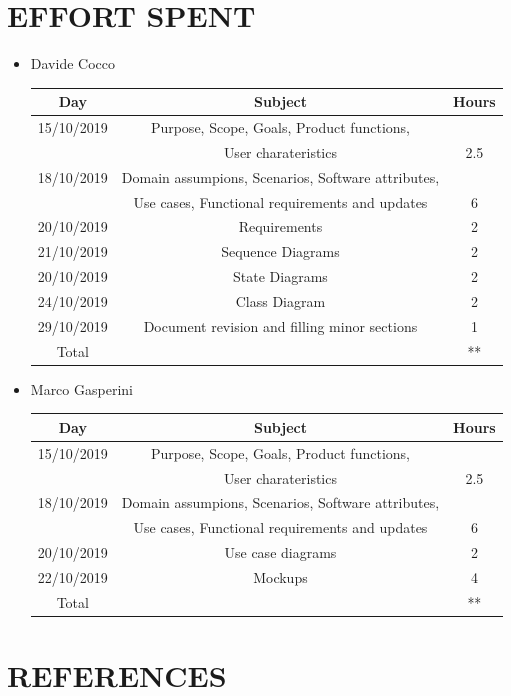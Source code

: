 \documentclass[12pt,a4paper]{article}
\begin{document}
\section{EFFORT	SPENT}
\begin{itemize}
\item {Davide Cocco}
 \begin{center}
			\begin{tabular}{| c | c | c |}
				\hline
				Day & Subject & Hours \\ \hline
				15/10/2019 & Purpose, Scope, Goals, Product functions,\\
				&User charateristics & 2.5 \\
				18/10/2019 & Domain assumpions, Scenarios, Software attributes, \\
				& Use cases, Functional requirements and updates  & 6\\
				20/10/2019 & Requirements  & 2\\	
				21/10/2019 & Sequence Diagrams  & 2\\
				20/10/2019 & State Diagrams  & 2\\	
				24/10/2019 & Class Diagram  & 2\\	
				29/10/2019 & Document revision and filling minor sections & 1\\	
				\hline
				Total & & ** \\
				\hline
			\end{tabular}
		\end{center}
\item {Marco Gasperini}
\begin{center}
			\begin{tabular}{| c | c | c |}
				\hline
				Day & Subject & Hours \\ \hline
				15/10/2019 & Purpose, Scope, Goals, Product functions,\\
				&User charateristics & 2.5 \\
				18/10/2019 & Domain assumpions, Scenarios, Software attributes, \\
				& Use cases, Functional requirements and updates  & 6\\
				20/10/2019 & Use case diagrams & 2\\	
				22/10/2019 & Mockups & 4\\	
				\hline
				Total & & ** \\
				\hline
			\end{tabular}
\end{center}
\end{itemize}
\section{REFERENCES}
\end{document}
